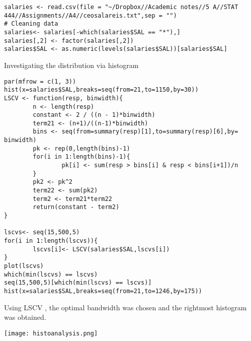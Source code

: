 \documentclass[11pt]{report}
\begin{document}
\begin{verbatim}
salaries <- read.csv(file = "~/Dropbox//Academic notes//5 A//STAT 444//Assignments//A4//ceosalareis.txt",sep = "")
# Cleaning data
salaries<- salaries[-which(salaries$SAL == "*"),]
salaries[,2] <- factor(salaries[,2])
salaries$SAL <- as.numeric(levels(salaries$SAL))[salaries$SAL]
\end{verbatim}
 Investigating the distribution via histogram
\begin{verbatim}
par(mfrow = c(1, 3))
hist(x=salaries$SAL,breaks=seq(from=21,to=1150,by=30))
LSCV <- function(resp, binwidth){
        n <- length(resp)
        constant <- 2 / ((n - 1)*binwidth)
        term21 <- (n+1)/((n-1)*binwidth)
        bins <- seq(from=summary(resp)[1],to=summary(resp)[6],by= binwidth)
        pk <- rep(0,length(bins)-1)
        for(i in 1:length(bins)-1){
                pk[i] <- sum(resp > bins[i] & resp < bins[i+1])/n
        }
        pk2 <- pk^2
        term22 <- sum(pk2)
        term2 <- term21*term22
        return(constant - term2)
}

lscvs<- seq(15,500,5)
for(i in 1:length(lscvs)){
        lscvs[i]<- LSCV(salaries$SAL,lscvs[i])        
}
plot(lscvs)
which(min(lscvs) == lscvs)
seq(15,500,5)[which(min(lscvs) == lscvs)]
hist(x=salaries$SAL,breaks=seq(from=21,to=1246,by=175))
\end{verbatim}

Using LSCV , the optimal bandwidth was chosen and the rightmost histogram was obtained.

\texttt{[image: histoanalysis.png]}
\end{document}
